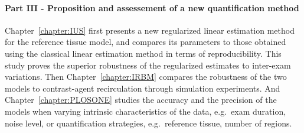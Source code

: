 \paragraph{Part III - Proposition and assessement of a new quantification method}
Chapter~\ref{chapter:IUS} first presents a new regularized linear estimation method for the reference tissue model, and compares its parameters to those obtained using the classical linear estimation method in terms of reproducibility.
This study proves the superior robustness of the regularized estimates to inter-exam variations.
Then Chapter~\ref{chapter:IRBM} compares the robustness of the two models to contrast-agent recirculation through simulation experiments.
And Chapter~\ref{chapter:PLOSONE} studies the accuracy and the precision of the models when varying intrinsic characteristics of the data, e.g.~exam duration, noise level, or quantification strategies, e.g.~reference tissue, number of regions.

\newpage

